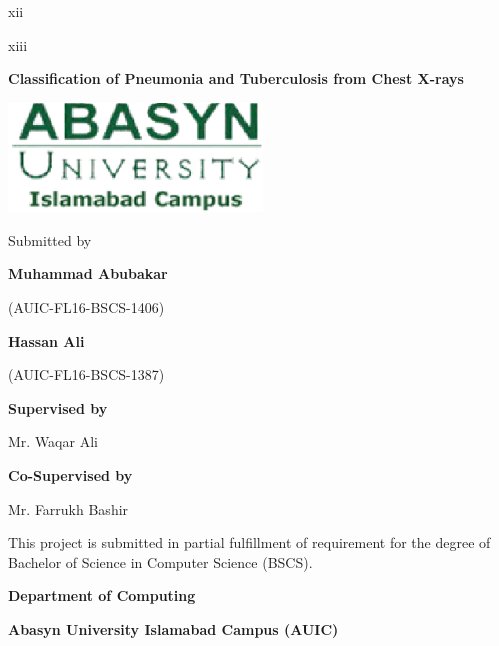\documentclass{article} %
\begin{document}


\noindent 

\noindent 

\noindent 

\noindent 

\noindent 

\noindent 

\noindent 

\noindent 

\noindent 

\noindent xii

\noindent xiii

\noindent 

\noindent 

\noindent \textbf{Classification of Pneumonia and Tuberculosis from Chest X-rays}

\noindent \textbf{}

\noindent \textbf{\includegraphics*[width=2.66in, height=1.14in, keepaspectratio=false]{image1}}

\noindent Submitted by

\noindent \textbf{Muhammad Abubakar}

\noindent (AUIC-FL16-BSCS-1406)

\noindent \textbf{Hassan Ali}

\noindent (AUIC-FL16-BSCS-1387)

\noindent \textbf{Supervised by}

\noindent Mr. Waqar Ali

\noindent 

\noindent \textbf{Co-Supervised by}

\noindent Mr. Farrukh Bashir

\noindent 

\noindent 

\noindent This project is submitted in partial fulfillment of requirement for the degree of Bachelor of Science in Computer Science (BSCS).

\noindent 

\noindent \textbf{Department of Computing}

\noindent \textbf{Abasyn University Islamabad Campus (AUIC)}
\end{document}
